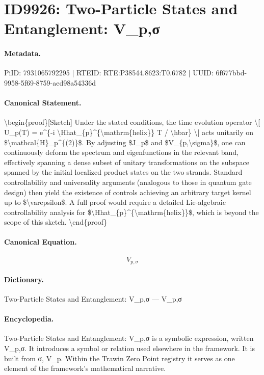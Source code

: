 \section*{ID9926: Two-Particle States and Entanglement: V\_p,σ}
\paragraph{Metadata.}
PiID: 7931065792295 | RTEID: RTE:P38544.8623:T0.6782 | UUID: 6f677bbd-9958-5f69-8759-aed98a54336d

\paragraph{Canonical Statement.}
\textbackslash{}begin\{proof\}[Sketch] Under the stated conditions, the time evolution operator \textbackslash{}[ U\_p(T) = e\textasciicircum{}\{-i \textbackslash{}Hhat\_\{p\}\textasciicircum{}\{\textbackslash{}mathrm\{helix\}\} T / \textbackslash{}hbar\} \textbackslash{}] acts unitarily on \$\textbackslash{}mathcal\{H\}\_p\textasciicircum{}\{(2)\}\$. By adjusting \$J\_p\$ and \$V\_\{p,\textbackslash{}sigma\}\$, one can continuously deform the spectrum and eigenfunctions in the relevant band, effectively spanning a dense subset of unitary transformations on the subspace spanned by the initial localized product states on the two strands. Standard controllability and universality arguments (analogous to those in quantum gate design) then yield the existence of controls achieving an arbitrary target kernel up to \$\textbackslash{}varepsilon\$. A full proof would require a detailed Lie-algebraic controllability analysis for \$\textbackslash{}Hhat\_\{p\}\textasciicircum{}\{\textbackslash{}mathrm\{helix\}\}\$, which is beyond the scope of this sketch. \textbackslash{}end\{proof\}

\paragraph{Canonical Equation.}
\[
V_{p,\sigma}
\]

\paragraph{Dictionary.}
Two-Particle States and Entanglement: V\_p,σ — V\_p,σ

\paragraph{Encyclopedia.}
Two-Particle States and Entanglement: V\_p,σ is a symbolic expression, written V\_p,σ. It introduces a symbol or relation used elsewhere in the framework. It is built from σ, V\_p. Within the Trawin Zero Point registry it serves as one element of the framework's mathematical narrative.
